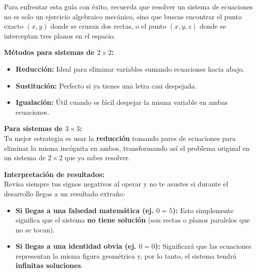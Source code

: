 \documentclass[letterpaper, 12pt]{article}
\newenvironment{kitpropiedades}[1]{%
    \begin{tcolorbox}[colback=celesteSuave, colframe=azulFuerte,
        title=\textbf{#1}, fonttitle=\bfseries]
}{%
    \end{tcolorbox}
}
\begin{document}
\newpage

\begin{kitpropiedades}{ESTRATEGIAS DE RESOLUCIÓN}
    Para enfrentar esta guía con éxito, recuerda que resolver un sistema de ecuaciones no es solo un ejercicio algebraico mecánico, sino que buscas encontrar el punto exacto $(x, y)$ donde se cruzan dos rectas, o el punto $(x, y, z)$ donde se interceptan tres planos en el espacio.

    \vspace{0.5em}
    \textbf{Métodos para sistemas de $2\times2$:}
    \begin{itemize}[itemsep=0.5em]
        \item \textbf{Reducción:} Ideal para eliminar variables sumando ecuaciones hacia abajo.
        \item \textbf{Sustitución:} Perfecto si ya tienes una letra casi despejada.
        \item \textbf{Igualación:} Útil cuando es fácil despejar la misma variable en ambas ecuaciones.
    \end{itemize}

    \vspace{0.5em}
    \textbf{Para sistemas de $3\times3$:} \\
    Tu mejor estrategia es usar la \textbf{reducción} tomando pares de ecuaciones para eliminar la misma incógnita en ambos, transformando así el problema original en un sistema de $2\times2$ que ya sabes resolver.

    \vspace{0.5em}
    \textbf{Interpretación de resultados:} \\
    Revisa siempre tus signos negativos al operar y no te asustes si durante el desarrollo llegas a un resultado extraño:
    \begin{itemize}[itemsep=0.5em]
        \item \textbf{Si llegas a una falsedad matemática (ej. $0=5$):} Esto simplemente significa que el sistema \textbf{no tiene solución} (son rectas o planos paralelos que no se tocan).
        \item \textbf{Si llegas a una identidad obvia (ej. $0=0$):} Significará que las ecuaciones representan la misma figura geométrica y, por lo tanto, el sistema tendrá \textbf{infinitas soluciones}.
    \end{itemize}
\end{kitpropiedades}
\end{document}
